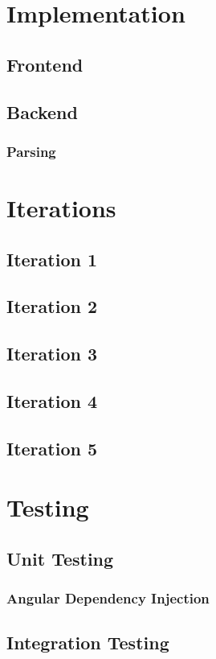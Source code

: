 \documentclass[12pt]{article}
\begin{document}
\newpage
\section{Implementation}
  \subsection{Frontend}
  \subsection{Backend}
    \subsubsection{Parsing}
\section{Iterations}
  \subsection{Iteration 1}
  \subsection{Iteration 2}
  \subsection{Iteration 3}
  \subsection{Iteration 4}
  \subsection{Iteration 5}
\section{Testing}
  \subsection{Unit Testing}
    \subsubsection{Angular Dependency Injection}
  \subsection{Integration Testing}
\end{document}
